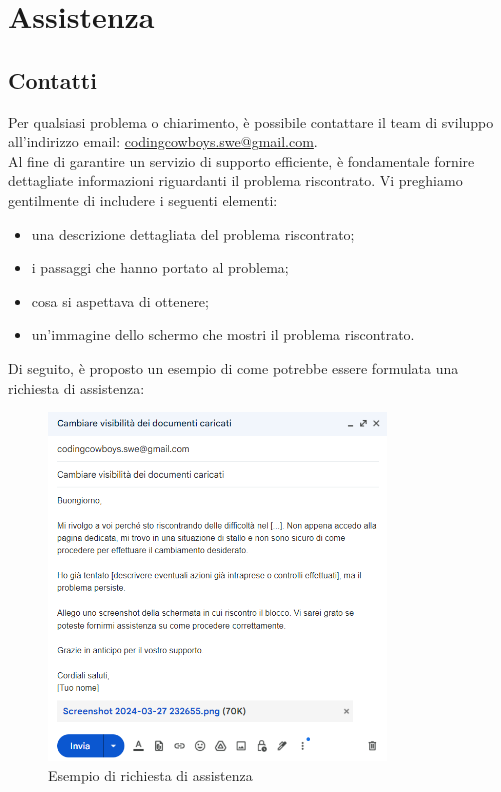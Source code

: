 \chapter{Assistenza} \label{cap:assistenza}

\section{Contatti}
Per qualsiasi problema o chiarimento, è possibile contattare il team di sviluppo all'indirizzo email: \href{mailto:codingcowboys.swe@gmail.com}{codingcowboys.swe@gmail.com}. \\
Al fine di garantire un servizio di supporto efficiente, è fondamentale fornire dettagliate informazioni riguardanti il problema riscontrato. Vi preghiamo gentilmente di includere i seguenti elementi:
    \begin{itemize}
        \item una descrizione dettagliata del problema riscontrato;
        \item i passaggi che hanno portato al problema;
        \item cosa si aspettava di ottenere;
        \item un'immagine dello schermo che mostri il problema riscontrato.
    \end{itemize}

Di seguito, è proposto un esempio di come potrebbe essere formulata una richiesta di assistenza:
\begin{figure}[h!]
    \centering
    \includegraphics[width=0.8\textwidth]{mailEsempio.png}
    \caption{Esempio di richiesta di assistenza}\label{fig:esempio_richiesta_assistenza}
\end{figure}